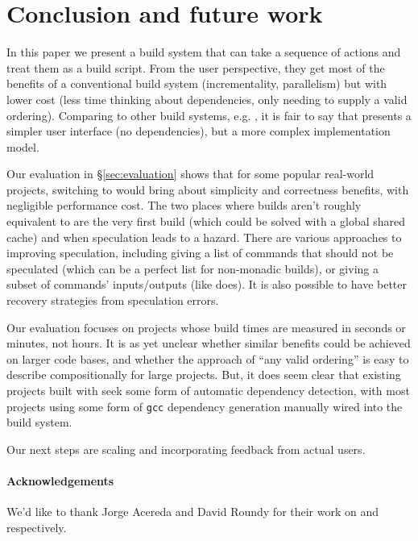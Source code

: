 \section{Conclusion and future work}
\label{sec:conclusion}

In this paper we present a build system that can take a sequence of actions and treat them as a build script. From the user perspective, they get most of the benefits of a conventional build system (incrementality, parallelism) but with lower cost (less time thinking about dependencies, only needing to supply a valid ordering). Comparing \Rattle to other build systems, e.g. \Make, it is fair to say that \Rattle presents a simpler user interface (no dependencies), but a more complex implementation model.

Our evaluation in \S\ref{sec:evaluation} shows that for some popular real-world projects, switching to \Rattle would bring about simplicity and correctness benefits, with negligible performance cost. The two places where builds aren't roughly equivalent to \Make are the very first build (which could be solved with a global shared cache) and when speculation leads to a hazard. There are various approaches to improving speculation, including giving \Rattle a list of commands that should not be speculated (which can be a perfect list for non-monadic builds), or giving \Rattle a subset of commands' inputs/outputs (like \Fac does). It is also possible to have better recovery strategies from speculation errors.

Our evaluation focuses on projects whose build times are measured in seconds or minutes, not hours. It is as yet unclear whether similar benefits could be achieved on larger code bases, and whether the \Rattle approach of ``any valid ordering'' is easy to describe compositionally for large projects.  But, it does seem clear that existing projects built with \Make seek some form of automatic dependency detection, with most projects using some form of \texttt{gcc} dependency generation manually wired into the build system.

Our next steps are scaling \Rattle and incorporating feedback from actual users.


\paragraph{Acknowledgements} We'd like to thank Jorge Acereda and David Roundy for their work on \Fsatrace and \Bigbro respectively.
